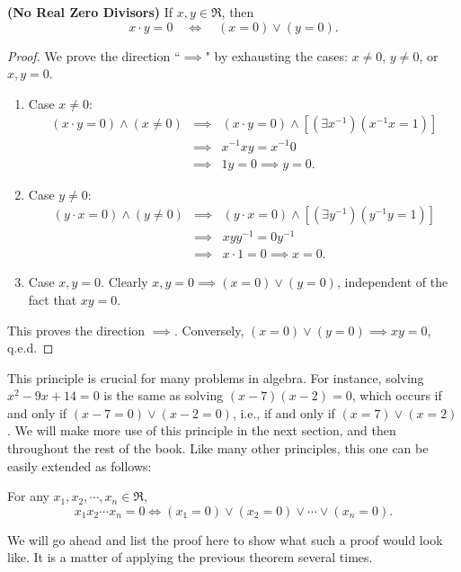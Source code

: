 

\begin{theorem} {\bf (No Real Zero Divisors)} If $x,y\in\Re$, then 
$$x\cdot y=0 \quad \iff \quad (x=0)\vee(y=0).$$
\label{NoZeroDivisors}\end{theorem}
\begin{proof} 
We prove the direction ``$\implies$"  by exhausting the cases:
$x\ne0$, $y\ne0$, or $x,y=0$.  
\begin{enumerate}
\item Case $x\ne0$: 
$$\begin{array}{rcl} (x\cdot y=0)\wedge(x\ne0)&\implies& (x\cdot y=0)\wedge 
[(\exists x^{-1})(x^{-1}x=1)]\\
& \implies &x^{-1}xy=x^{-1}0\\
&\implies &1y=0\implies y=0.\end{array}$$ 
\item Case $y\ne0$:
$$\begin{array}{rcl} (y\cdot x=0)\wedge(y\ne0)&\implies& (y\cdot x=0)\wedge
[(\exists y^{-1})( y^{-1}y=1)]\\
& \implies &xyy^{-1}=0y^{-1}\\
&\implies &x\cdot1=0\implies x=0.\end{array}$$
\item Case $x,y=0$.  Clearly $x,y=0\implies (x=0)\vee(y=0)$, independent
of the fact that $xy=0$.  
\end{enumerate}
This proves the direction $\implies$. 
Conversely, $(x=0)\vee(y=0)\implies xy=0$, q.e.d.  
\end{proof}

This principle is crucial for many problems in algebra.  For instance,
solving $x^2-9x+14=0$ is the same as solving $(x-7)(x-2)=0$, which
occurs if and only if $(x-7=0)\vee(x-2=0)$, i.e., if and only if
$(x=7)\vee(x=2)$.  We will make more use of this principle in the
next section, and then throughout the rest of the book. 
Like many other principles, this one can be easily extended
as follows:
\begin{corollary} For any $x_1,x_2,\cdots,x_n\in\Re$, 
$$x_1x_2\cdots x_n=0\iff (x_1=0)\vee(x_2=0)\vee\cdots\vee(x_n=0).$$
\end{corollary}
We will go ahead and list the proof here to show what such
a proof would look like.  It is a matter of applying the previous
theorem several times.

